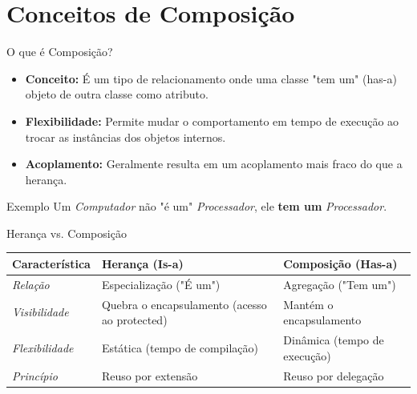 \documentclass[9pt]{beamer}
\begin{document}
\section{Conceitos de Composição}
\begin{frame}{O que é Composição?}
    \begin{itemize}
        \item \textbf{Conceito:} É um tipo de relacionamento onde uma classe "tem um" (has-a) objeto de outra classe como atributo.
        \item \textbf{Flexibilidade:} Permite mudar o comportamento em tempo de execução ao trocar as instâncias dos objetos internos.
        \item \textbf{Acoplamento:} Geralmente resulta em um acoplamento mais fraco do que a herança.
    \end{itemize}
    \begin{block}{Exemplo}
        Um \textit{Computador} não "é um" \textit{Processador}, ele \textbf{tem um} \textit{Processador}.
    \end{block}
\end{frame}

\begin{frame}{Herança vs. Composição}
    \centering
    \begin{small}
    \begin{tabular}{|l|p{4cm}|p{4cm}|}
        \hline
        \textbf{Característica} & \textbf{Herança (Is-a)} & \textbf{Composição (Has-a)} \\ \hline
        \textit{Relação} & Especialização ("É um") & Agregação ("Tem um") \\ \hline
        \textit{Visibilidade} & Quebra o encapsulamento (acesso ao protected) & Mantém o encapsulamento \\ \hline
        \textit{Flexibilidade} & Estática (tempo de compilação) & Dinâmica (tempo de execução) \\ \hline
        \textit{Princípio} & Reuso por extensão & Reuso por delegação \\ \hline
    \end{tabular}
    \end{small}
\end{frame}
\end{document}
